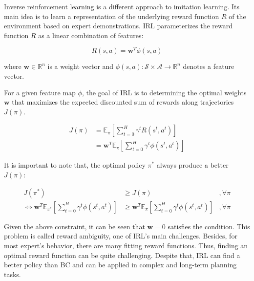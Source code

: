 Inverse reinforcement learning is a different approach to imitation learning.
Its main idea is to learn a representation of the underlying reward function $R$ of the environment based on expert demonstrations.
IRL parameterizes the reward function $R$ as a linear combination of features:

\[
  R(s,a) = \mathbf{w}^T \phi(s,a)
\]

where $\mathbf{w} \in \mathbb{R}^n$ is a weight vector and $\phi(s,a):\mathcal{S}\times\mathcal{A}\to\mathbb{R}^n$ denotes a feature vector.

For a given feature map $\phi$,
the goal of IRL is to determining the optimal weights $\mathbf{w}$ that maximizes the expected discounted sum of rewards along trajectories $J(\pi)$.

\begin{align*}
  J(\pi) & = \mathbb{E}_\pi [\sum^H_{t=0} \gamma^t R(s^t,a^t)]                  \\
         & = \mathbf{w}^T \mathbb{E}_\pi [\sum^H_{t=0} \gamma^t  \phi(s^t,a^t)]
\end{align*}

It is important to note that,
the optimal policy $\pi^*$ always produce a better $J(\pi)$:

\begin{align*}
  J(\pi^*)                                                                                & \geq J(\pi)                                                             & ,\forall \pi \\
  \Leftrightarrow  \mathbf{w}^T \mathbb{E}_{\pi^*} [\sum^H_{t=0} \gamma^t  \phi(s^t,a^t)] & \geq \mathbf{w}^T \mathbb{E}_\pi [\sum^H_{t=0} \gamma^t  \phi(s^t,a^t)] & ,\forall \pi
\end{align*}

Given the above constraint,
it can be seen that $\mathbf{w} = 0$ satisfies the condition.
This problem is called reward ambiguity,
one of IRL's main challenges.
Besides,
for most expert's behavior,
there are many fitting reward functions.
Thus,
finding an optimal reward function can be quite challenging.
Despite that,
IRL can find a better policy than BC and can be applied in complex and long-term planning tasks.
